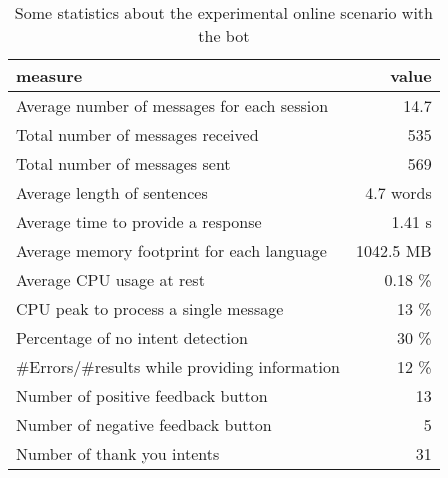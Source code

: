 
\begin{table}
  \begin{tabularx}{\textwidth}{Xr}
    \toprule
    \textbf{measure} & \textbf{value} \\
    \midrule
    Average number of messages for each session & 14.7 \\
    Total number of messages received & 535 \\
    Total number of messages sent & 569 \\
    Average length of sentences & 4.7 words \\
    Average time to provide a response & 1.41 s \\
    Average memory footprint for each language & 1042.5 MB \\
    Average CPU usage at rest & 0.18 \% \\
    CPU peak to process a single message & 13 \% \\
    Percentage of no intent detection & 30 \% \\
    \#Errors/\#results while providing information & 12 \% \\
    Number of positive feedback button & 13 \\
    Number of negative feedback button & 5 \\
    Number of thank you intents & 31 \\
    \bottomrule
  \end{tabularx}
  \caption{Some statistics about the experimental online scenario with the bot}\label{tab:botStatistics}
\end{table}
